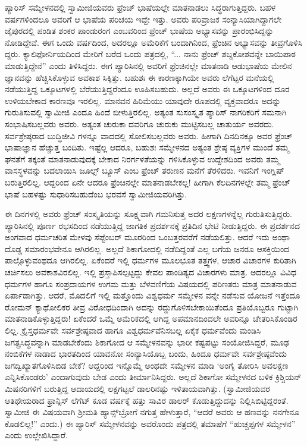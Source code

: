 ಪ್ಯಾರಿಸ್ ಸಮ್ಮೇಳನದಲ್ಲಿ ಸ್ವಾಮೀಜಿಯವರು ಫ್ರೆಂಚ್ ಭಾಷೆಯಲ್ಲೇ ಮಾತನಾಡಲು ಸಿದ್ಧರಾಗುತ್ತಿದ್ದರು. ಬಹಳ ವರ್ಷಗಳಿಂದಲೂ ಅವರಿಗೆ ಆ ಭಾಷೆಯ ಪರಿಚಯ ಇದ್ದೇ ಇತ್ತು. ಅವರು ಪರಿವ್ರಾಜಕ ಸಂನ್ಯಾಸಿಯಾಗಿದ್ದಾಗಲೇ ಜೈಪುರದಲ್ಲಿ ಪಂಡಿತ ಶಂಕರ ಪಾಂಡುರಂಗ ಎಂಬವರಿಂದ ಫ್ರೆಂಚ್ ಭಾಷೆಯ ಅಭ್ಯಾಸವನ್ನು ಪ್ರಾರಂಭಿಸಿದ್ದನ್ನು ನೋಡಿದ್ದೇವೆ. ಈಗ ಒಂದು ವರ್ಷದಿಂದ, ಅದರಲ್ಲೂ ಅಮೆರಿಕೆಗೆ ಬಂದಾಗಿನಿಂದ, ಫ್ರೆಂಚಿನ ಅಭ್ಯಾಸವನ್ನು ತೀವ್ರಗೊಳಿಸಿ ದ್ದರು. ಕ್ಯಾಲಿಫೋರ್ನಿಯದಿಂದ ಮೇರಿಗೆ ಬರೆದ ಒಂದು ಪತ್ರದಲ್ಲಿ, “... ನಾನು ಫ್ರೆಂಚ್ ಶಬ್ದಕೋಶವನ್ನೇ ಬಾಯಿಪಾಠ ಮಾಡುತ್ತಿದ್ದೇನೆ” ಎಂದು ತಿಳಿಸಿದ್ದರು. ಈಗ ಪ್ಯಾರಿಸಿನಲ್ಲಿ ಅವರಿಗೆ ಫ್ರೆಂಚಿನಲ್ಲೇ ಮಾತನಾಡಿ ಆಡುಭಾಷೆಯ ಮೇಲಿನ ಜ್ಞಾನವನ್ನು ಹೆಚ್ಚಿಸಿಕೊಳ್ಳುವ ಅವಕಾಶ ಸಿಕ್ಕಿತ್ತು. ಬಹುಶಃ ಈ ಕಾರಣಕ್ಕಾಗಿಯೇ ಅವರು ಲೆಗೆಟ್ಟರ ಮನೆಯಲ್ಲಿ ನಡೆಯುತ್ತಿದ್ದ ಒಕ್ಕೂಟಗಳಲ್ಲಿ ಬೆರೆಯುತ್ತಿದ್ದರೆಂದೂ ಊಹಿಸಬಹುದು. ಅಲ್ಲದೆ ಅವರು ಈ ಒಕ್ಕೂಟಗಳಿಂದ ದೂರ ಉಳಿಯಬೇಕಾದ ಕಾರಣವೂ ಇರಲಿಲ್ಲ. ಮಾನವನ ಹಿರಿಮೆಯು ಯಾವುದೇ ರೂಪದಲ್ಲಿ ವ್ಯಕ್ತವಾದರೂ ಅದನ್ನು ಗುರುತಿಸುವಲ್ಲಿ ಸ್ವಾಮೀಜಿ ಎಂದೂ ಹಿಂದೆ ಬೀಳುತ್ತಿರಲಿಲ್ಲ. ಅತ್ಯಂತ ಸುಸಂಸ್ಕೃತ ಪ್ಯಾರಿಸ್ ನಾಗರಿಕರಿಗೆ ಸಮನಾಗಿ ಸಂಭಾಷಿಸಬಲ್ಲವರು ಅವರು. ಅತ್ಯಂತ ಚುರುಕಾ ದವರಿಗೂ ಚುರುಕು ಮುಟ್ಟಿಸಬಲ್ಲ ಚಾತುರ್ಯ ಅವರದು. ಸರ್ವಶ್ರೇಷ್ಠರಾದ ಬುದ್ಧಿಜೀವಿ ಗಳನ್ನೂ ವಾದದಲ್ಲಿ ಸೋಲಿಸಬಲ್ಲವರು ಅವರು. ಹೀಗಾಗಿ ದಿನದಿನಕ್ಕೂ ಅವರ ಫ್ರೆಂಚ್ ಭಾಷಾಜ್ಞಾನ ಹೆಚ್ಚುತ್ತ ಬಂದಿತು. ಇಷ್ಟೆಲ್ಲ ಆದರೂ, ಬಹುಶಃ ಸಮ್ಮೇಳನದ ಅತ್ಯಂತ ಶ್ರೇಷ್ಠ ವ್ಯಕ್ತಿಗಳ ಮುಂದೆ ತಮ್ಮ ಘನತೆಗೆ ತಕ್ಕಂತೆ ಮಾತನಾಡುವುದಕ್ಕೆ ಬೇಕಾದ ನಿರರ್ಗಳತೆಯನ್ನು ಗಳಿಸಿಕೊಳ್ಳುವ ಉದ್ದೇಶದಿಂದ ಅವರು ತಮ್ಮ ವಾಸಸ್ಥಳವನ್ನು ಬದಲಾಯಿಸಿ ಜೂಲ್ಸ್ ಬ್ಯೂಸ್ ಎಂಬ ಫ್ರೆಂಚ್ ತರುಣನ ಮನೆಗೆ ತೆರಳಿದರು. ಇವನಿಗೆ ಇಂಗ್ಲಿಷ್ ಬರುತ್ತಿರಲಿಲ್ಲ. ಆದ್ದರಿಂದ ಏನೇ ಆದರೂ ಫ್ರೆಂಚಿನಲ್ಲೇ ಮಾತನಾಡಬೇಕಲ್ಲ! ಹೀಗಾಗಿ ಕೆಲದಿನಗಳಲ್ಲೇ ತಮ್ಮ ಫ್ರೆಂಚ್ ಭಾಷೆ ಬಹಳಷ್ಟು ಸುಧಾರಿಸಬಹುದೆಂಬ ಭರವಸೆ ಸ್ವಾಮೀಜಿಯವರಿಗಿತ್ತು.

ಈ ದಿನಗಳಲ್ಲಿ ಅವರು ಫ್ರೆಂಚ್ ಸಂಸ್ಕೃತಿಯನ್ನು ಸೂಕ್ಷ್ಮವಾಗಿ ಗಮನಿಸುತ್ತ ಅದರ ಲಕ್ಷಣಗಳನ್ನೆಲ್ಲ ಗುರುತಿಸುತ್ತಿದ್ದರು. ಪ್ಯಾರಿಸಿನಲ್ಲಿ ಪೂರ್ಣ ರಭಸದಿಂದ ನಡೆಯುತ್ತಿದ್ದ ಜಾಗತಿಕ ಪ್ರದರ್ಶನಕ್ಕೆ ಪ್ರತಿದಿನ ಭೇಟಿ ನೀಡುತ್ತಿದ್ದರು. ಈ ಪ್ರದರ್ಶನದ ಅಂಗವಾದ ಧರ್ಮಚರಿತ ಮೇಳವು ಸೆಪ್ಟೆಂಬರ್ ಮೂರರಿಂದ ಒಂಬತ್ತರವರೆಗೆ ನಡೆಯಲಿತ್ತು. ಆದರೆ ಇದು ಅಂಥಾ ದೊಡ್ಡ ಸಮಾರಂಭವೇನೂ ಆಗಿರಲಿಲ್ಲ. ಅಲ್ಲದೆ ಶಿಕಾಗೋದಲ್ಲಿ ನಡೆದಿದ್ದಂತೆ ಎಲ್ಲ ಬಗೆಯ ಜನರೂ ಆಸಕ್ತಿಯಿಂದ ಪಾಲ್ಗೊಳ್ಳುವಂಥದೂ ಆಗಿರಲಿಲ್ಲ. ಏಕೆಂದರೆ ಇಲ್ಲಿ ಧರ್ಮಗಳ ಮೂಲಭೂತ ತತ್ತ್ವಗಳ, ಆಚಾರ ವಿಚಾರಗಳ ಕುರಿತಾಗಿ ಚರ್ಚಿಸಲು ಅವಕಾಶವಿರಲಿಲ್ಲ. ಇಲ್ಲಿ ಪ್ರಸ್ತಾಪಿಸಲ್ಪಟ್ಟದ್ದು ಕೇವಲ ಪಾಂಡಿತ್ಯದ ವಿಚಾರಗಳು ಮಾತ್ರ. ಅದರಲ್ಲೂ ವಿವಿಧ ಧರ್ಮಗಳ ಹಾಗೂ ಸಂಪ್ರದಾಯಗಳ ಉಗಮ ಮತ್ತು ಬೆಳವಣಿಗೆಯ ವಿಷಯದಲ್ಲಿ ಪರಿಣತರು ಮಾತ್ರ ಮಾತನಾಡುವ ಏರ್ಪಾಡಾಗಿತ್ತು. ಆದರೆ, ಮೊದಲಿಗೆ ಇಲ್ಲಿ ಮತ್ತೊಂದು ವಿಶ್ವಧರ್ಮ ಸಮ್ಮೇಳನ ವನ್ನೇ ನಡೆಸುವ ಯೋಜನೆ ಇತ್ತೆಂದೂ ರೋಮನ್ ಕ್ಯಾಥೋಲಿಕರ ತೀವ್ರ ವಿರೋಧದಿಂದಾಗಿ ಅದನ್ನು ರದ್ದುಗೊಳಿಸಬೇಕಾಯಿತೆಂದೂ ಪ್ರತಿಯೊಬ್ಬರೂ ಗುಟ್ಟಾಗಿ ಮಾತನಾಡಿಕೊಳ್ಳುತ್ತಿದ್ದರು! ಏಕೆಂದರೆ ಒಮ್ಮೆ ಅಮೆರಿಕದಲ್ಲಿ ಆಗಿದ್ದ ಅಪಮಾನದಿಂದಲೇ ಅವರಿನ್ನೂ ಚೇತರಿಸಿಕೊಂಡಿರ ಲಿಲ್ಲ. ಕ್ರೈಸ್ತಧರ್ಮವೇ ಸರ್ವಶ್ರೇಷ್ಠವಾದ ಹಾಗೂ ವಿಶ್ವಧರ್ಮವೆನಿಸಬಲ್ಲ ಏಕೈಕ ಧರ್ಮವೆಂದು ಮಂಡಿಸಿ ಜಗತ್ಪ್ರಸಿದ್ಧವನ್ನಾಗಿ ಮಾಡಬೇಕೆಂದು ಶಿಕಾಗೋದ ಆ ಸಮ್ಮೇಳನವನ್ನು ಭಾರೀ ಕಷ್ಟಪಟ್ಟು ಸಂಯೋಜಿಸಿದ್ದರೆ, ಮೂಢ ನಂಬಿಕೆಗಳ ನಾಡಾದ ಭಾರತದಿಂದ ಯಾವನೋ ಸಂನ್ಯಾಸಿಯೊಬ್ಬ ಬಂದು, ಹಿಂದೂ ಧರ್ಮವೇ ಸರ್ವಶ್ರೇಷ್ಠವೆಂದು ಜಗದ್ವಿಖ್ಯಾತಗೊಳಿಸಿಬಿಡ ಬೇಕೆ? ಆದ್ದರಿಂದ ಇನ್ನೊಮ್ಮೆ ಅಂಥದೇ ಸಮ್ಮೇಳನ ಮಾಡಿ ‘ಅಂಗೈ ತೋರಿಸಿ ಅವಲಕ್ಷಣ ಎನ್ನಿಸಿಕೊಂಡರು’ ಎಂದಾಗುವುದು ಬೇಡ ಎಂದು ತೀರ್ಮಾನಿಸಿದ್ದರು. ಅಲ್ಲದೆ ಶಿಕಾಗೋ ಸಮ್ಮೇಳನದ ಬಳಿಕ ಕ್ರಿಶ್ಚಿಯನ್ ಮಿಷನರಿಗಳಿಗೆ ಬರುತ್ತಿದ್ದ ಆದಾಯದಲ್ಲಿ ಲಕ್ಷಗಟ್ಟಲೆ ಡಾಲರಿನಷ್ಟು ಇಳಿತಾಯವಾಗಿತ್ತು. (ಸ್ವಾಮೀಜಿಯವರ ಆತಿಥೇಯರಾದ ಫ್ರಾನ್ಸಿಸ್ ಲೆಗೆಟ್ ಕೂಡ ವರ್ಷಕ್ಕೆ ಹತ್ತು ಸಾವಿರ ಡಾಲರ್ ಕೊಡುತ್ತಿದ್ದುದನ್ನು ನಿಲ್ಲಿಸಿಬಿಟ್ಟಿದ್ದರಂತೆ. ಸ್ವಾಮೀಜಿ ಈ ವಿಷಯವಾಗಿ ಶ್ರೀಮತಿ ಹ್ಯಾನ್ಸ್​ಬ್ರೋಗೆ ನಗುತ್ತ ಹೇಳುತ್ತಾರೆ, “ಆದರೆ ಅವರು ಆ ಹಣವನ್ನು ನನಗೇನೂ ಕೊಡಲಿಲ್ಲ!” ಎಂದು.) ಈ ಪ್ಯಾರಿಸ್ ಸಮ್ಮೇಳನವನ್ನು ಅವರೊಂದು ಪತ್ರದಲ್ಲಿ ತಮಾಷೆಗೆ “ಹುಚ್ಚಪ್ಪಗಳ ಸಮ್ಮೇಳನ” ಎಂದು ಉಲ್ಲೇಖಿಸಿದ್ದಾರೆ.

